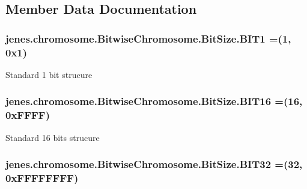 \subsection{Member Data Documentation}
\hypertarget{enumjenes_1_1chromosome_1_1_bitwise_chromosome_1_1_bit_size_a1c1800310dcf0a10eb4ec5262f67c4a9}{
\subsubsection[{B\-I\-T1}]{\setlength{\rightskip}{0pt plus 5cm}jenes.\-chromosome.\-Bitwise\-Chromosome.\-Bit\-Size.\-B\-I\-T1 =(1, 0x1)}}\label{enumjenes_1_1chromosome_1_1_bitwise_chromosome_1_1_bit_size_a1c1800310dcf0a10eb4ec5262f67c4a9}
Standard 1 bit strucure \hypertarget{enumjenes_1_1chromosome_1_1_bitwise_chromosome_1_1_bit_size_a0b700c4a19af2e751fcaa42f44624e92}{
\subsubsection[{B\-I\-T16}]{\setlength{\rightskip}{0pt plus 5cm}jenes.\-chromosome.\-Bitwise\-Chromosome.\-Bit\-Size.\-B\-I\-T16 =(16, 0x\-F\-F\-F\-F)}}\label{enumjenes_1_1chromosome_1_1_bitwise_chromosome_1_1_bit_size_a0b700c4a19af2e751fcaa42f44624e92}
Standard 16 bits strucure \hypertarget{enumjenes_1_1chromosome_1_1_bitwise_chromosome_1_1_bit_size_a00d4f4e8c35a3d6e7e51a78be3206505}{
\subsubsection[{B\-I\-T32}]{\setlength{\rightskip}{0pt plus 5cm}jenes.\-chromosome.\-Bitwise\-Chromosome.\-Bit\-Size.\-B\-I\-T32 =(32, 0x\-F\-F\-F\-F\-F\-F\-F\-F)}}\label{enumjenes_1_1chromosome_1_1_bitwise_chromosome_1_1_bit_size_a00d4f4e8c35a3d6e7e51a78be3206505}
